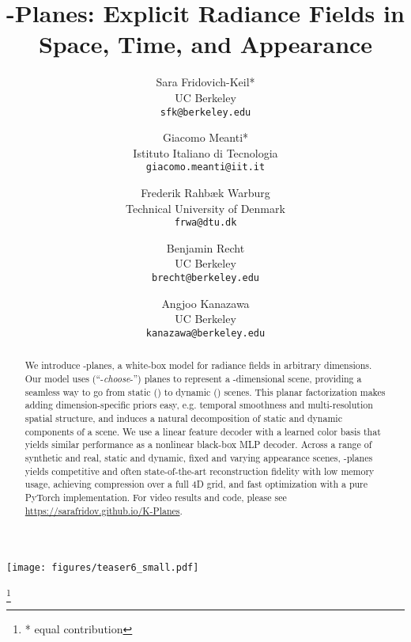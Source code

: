 \documentclass[10pt,twocolumn,letterpaper]{article}
\newcommand\blfootnote[1]{\begingroup
  \renewcommand\thefootnote{}\footnote{#1}\addtocounter{footnote}{-1}\endgroup
}
\begin{document}
\title{-Planes:  Explicit Radiance Fields in Space, Time, and Appearance}

\author{Sara Fridovich-Keil*\\
UC Berkeley\\
{\tt\small sfk@berkeley.edu}
\and
Giacomo Meanti*\\
Istituto Italiano di Tecnologia\\
{\tt\small giacomo.meanti@iit.it}
\and
Frederik Rahb\ae k Warburg\\
Technical University of Denmark\\
{\tt\small frwa@dtu.dk}
\and
Benjamin Recht\\
UC Berkeley\\
{\tt\small brecht@berkeley.edu}
\and
Angjoo Kanazawa\\
UC Berkeley\\
{\tt\small kanazawa@berkeley.edu}
}


\maketitle

\begin{strip}\centering
\vspace*{-4em}  \captionsetup{type=figure}
\texttt{[image: figures/teaser6\_small.pdf]}
\end{strip}

\blfootnote{* equal contribution}



\vspace{-10pt}

\begin{abstract}
We introduce -planes, a white-box model for radiance fields in arbitrary dimensions. Our model uses  (``-\textit{choose}-'') planes to represent a -dimensional scene, providing a seamless way to go from static () to dynamic () scenes. This planar factorization makes adding dimension-specific priors easy, e.g. temporal smoothness and multi-resolution spatial structure, and induces a natural decomposition of static and dynamic components of a scene. We use a linear feature decoder with a learned color basis that yields similar performance as a nonlinear black-box MLP decoder. Across a range of synthetic and real, static and dynamic, fixed and varying appearance scenes, -planes yields competitive and often state-of-the-art reconstruction fidelity with low memory usage, achieving  compression over a full 4D grid, and fast optimization with a pure PyTorch implementation. For video results and code, please see \url{https://sarafridov.github.io/K-Planes}.

\vspace{-1pt}

\end{abstract}
\end{document}
